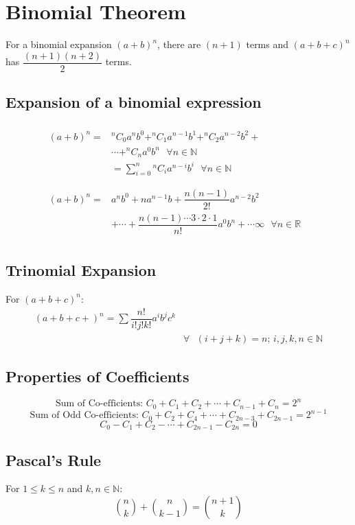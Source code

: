 \chapter{Binomial Theorem}
For a binomial expansion $(a+b)^n$, there are $(n+1)$ terms and $(a+b+c)^n$ has $\dfrac{(n+1)(n+2)}{2}$ terms.


\section{Expansion of a binomial expression\newline}
\begin{eqnarray}
	\begin{aligned}
		\begin{split}
			(a+b)^n= & ^nC_0 a^n b^0+^nC_1 a^{n-1} b^1+^nC_2 a^{n-2} b^2+ & \\ & \cdots+^nC_n a^0 b^n\text{ }\forall n \in \mathbb{N} & \\ & =\sum_{i=0}^{n} {^nC_{i}} a^{n-i} b^i\text{ }\forall n \in \mathbb{N}
		\end{split}
	\end{aligned}\\
	\begin{aligned}
		\begin{split}
			(a+b)^n= & a^n b^0+na^{n-1}b+\dfrac{n(n-1)}{2!}a^{n-2}b^2 & \\ & +\cdots+\dfrac{n(n-1)\cdots3\cdot2\cdot1}{n!} a^0 b^n+\cdots\infty \text{ }\forall n \in \mathbb{R}
		\end{split}
	\end{aligned}
\end{eqnarray}


\section{Trinomial Expansion}
For $(a+b+c)^n$:
\begin{equation}
	\begin{split}
		(a+b+c+)^n=\sum \dfrac{n!}{i! j! k!} a^i b^j c^k & \\ & \forall\text{ }(i+j+k)=n\text{; }i,j,k,n \in \mathbb{N}
	\end{split}
\end{equation}


\section{Properties of Coefficients}
\begin{equation}
	\text{Sum of Co-efficients: }C_0+C_1+C_2+\cdots+C_{n-1}+C_n=2^n
\end{equation}
\begin{equation}
	\text{Sum of Odd Co-efficients: }C_0+C_2+C_4+\cdots+C_{2n-3}+C_{2n-1}=2^{n-1}
\end{equation}
\begin{equation}
	C_0-C_1+C_2-\cdots+C_{2n-1}-C_{2n}=0
\end{equation}


\section{Pascal's Rule}
For $1 \leq k \leq n$ and  $k,n \in \mathbb{N}$:
\begin{equation}
	{{n}\choose{k}}+{{n}\choose{k-1}} ={{n+1}\choose{k}}
\end{equation}
